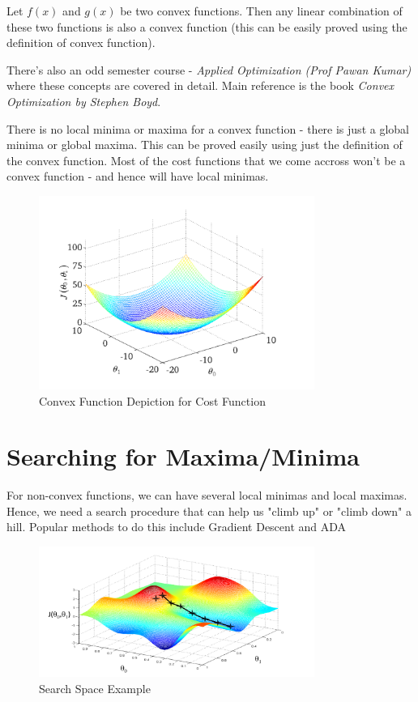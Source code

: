 Let $f(x)$ and $g(x)$ be two convex functions. Then any linear combination of these two functions is also a convex function (this can be easily proved using the definition of convex function).

There's also an odd semester course - \textit{Applied Optimization (Prof Pawan Kumar)} where these concepts are covered in detail. Main reference is the book \textit{Convex Optimization by Stephen Boyd}.

There is no local minima or maxima for a convex function - there is just a global minima or global maxima. This can be proved easily using just the definition of the convex function. Most of the cost functions that we come accross won't be a convex function - and hence will have local minimas.

\begin{figure}[ht]
    \centering
    \includegraphics[width=9cm]{img/convex-cost-fn.png}
    \caption{Convex Function Depiction for Cost Function}
    \label{fig:cost-linear-regression}
\end{figure}

\section{Searching for Maxima/Minima}

For non-convex functions, we can have several local minimas and local maximas. Hence, we need a search procedure that can help us "climb up" or "climb down" a hill. Popular methods to do this include Gradient Descent and ADA

\begin{figure}[h]
    \centering
    \includegraphics[width=9cm]{img/search-space.png}
    \caption{Search Space Example}
    \label{fig:search-space-example}
\end{figure}

